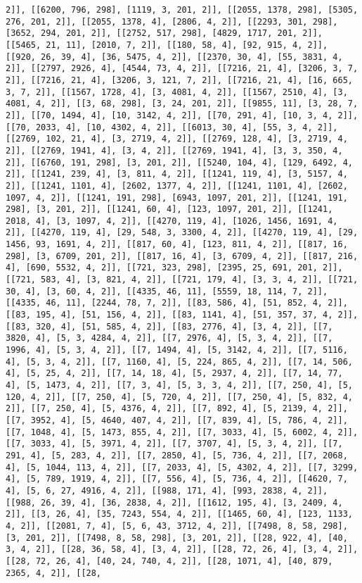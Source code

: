 \documentclass[12pt,fleqn]{article}\usepackage{../../common}
\begin{document}
\begin{verbatim}
2]], [[6200, 796, 298], [1119, 3, 201, 2]], [[2055, 1378, 298], [5305, 276, 201, 2]], [[2055, 1378, 4], [2806, 4, 2]], [[2293, 301, 298], [3652, 294, 201, 2]], [[2752, 517, 298], [4829, 1717, 201, 2]], [[5465, 21, 11], [2010, 7, 2]], [[180, 58, 4], [92, 915, 4, 2]], [[920, 26, 39, 4], [36, 5475, 4, 2]], [[2370, 30, 4], [55, 3831, 4, 2]], [[2797, 2926, 4], [4544, 73, 4, 2]], [[7216, 21, 4], [3206, 3, 7, 2]], [[7216, 21, 4], [3206, 3, 121, 7, 2]], [[7216, 21, 4], [16, 665, 3, 7, 2]], [[1567, 1728, 4], [3, 4081, 4, 2]], [[1567, 2510, 4], [3, 4081, 4, 2]], [[3, 68, 298], [3, 24, 201, 2]], [[9855, 11], [3, 28, 7, 2]], [[70, 1494, 4], [10, 3142, 4, 2]], [[70, 291, 4], [10, 3, 4, 2]], [[70, 2033, 4], [10, 4302, 4, 2]], [[6013, 30, 4], [55, 3, 4, 2]], [[2769, 102, 21, 4], [3, 2719, 4, 2]], [[2769, 128, 4], [3, 2719, 4, 2]], [[2769, 1941, 4], [3, 4, 2]], [[2769, 1941, 4], [3, 3, 350, 4, 2]], [[6760, 191, 298], [3, 201, 2]], [[5240, 104, 4], [129, 6492, 4, 2]], [[1241, 239, 4], [3, 811, 4, 2]], [[1241, 119, 4], [3, 5157, 4, 2]], [[1241, 1101, 4], [2602, 1377, 4, 2]], [[1241, 1101, 4], [2602, 1097, 4, 2]], [[1241, 191, 298], [6943, 1097, 201, 2]], [[1241, 191, 298], [3, 201, 2]], [[1241, 60, 4], [123, 1097, 201, 2]], [[1241, 2018, 4], [3, 1097, 4, 2]], [[4270, 119, 4], [1026, 1456, 1691, 4, 2]], [[4270, 119, 4], [29, 548, 3, 3300, 4, 2]], [[4270, 119, 4], [29, 1456, 93, 1691, 4, 2]], [[817, 60, 4], [123, 811, 4, 2]], [[817, 16, 298], [3, 6709, 201, 2]], [[817, 16, 4], [3, 6709, 4, 2]], [[817, 216, 4], [690, 5532, 4, 2]], [[721, 323, 298], [2395, 25, 691, 201, 2]], [[721, 583, 4], [3, 821, 4, 2]], [[721, 179, 4], [3, 3, 4, 2]], [[721, 30, 4], [3, 60, 4, 2]], [[4335, 46, 11], [5559, 18, 114, 7, 2]], [[4335, 46, 11], [2244, 78, 7, 2]], [[83, 586, 4], [51, 852, 4, 2]], [[83, 195, 4], [51, 156, 4, 2]], [[83, 1141, 4], [51, 357, 37, 4, 2]], [[83, 320, 4], [51, 585, 4, 2]], [[83, 2776, 4], [3, 4, 2]], [[7, 3820, 4], [5, 3, 4284, 4, 2]], [[7, 2976, 4], [5, 3, 4, 2]], [[7, 1996, 4], [5, 3, 4, 2]], [[7, 1494, 4], [5, 3142, 4, 2]], [[7, 5116, 4], [5, 3, 4, 2]], [[7, 1160, 4], [5, 224, 865, 4, 2]], [[7, 14, 506, 4], [5, 25, 4, 2]], [[7, 14, 18, 4], [5, 2937, 4, 2]], [[7, 14, 77, 4], [5, 1473, 4, 2]], [[7, 3, 4], [5, 3, 3, 4, 2]], [[7, 250, 4], [5, 120, 4, 2]], [[7, 250, 4], [5, 720, 4, 2]], [[7, 250, 4], [5, 832, 4, 2]], [[7, 250, 4], [5, 4376, 4, 2]], [[7, 892, 4], [5, 2139, 4, 2]], [[7, 3952, 4], [5, 4640, 407, 4, 2]], [[7, 839, 4], [5, 786, 4, 2]], [[7, 1048, 4], [5, 1473, 855, 4, 2]], [[7, 3033, 4], [5, 6002, 4, 2]], [[7, 3033, 4], [5, 3971, 4, 2]], [[7, 3707, 4], [5, 3, 4, 2]], [[7, 291, 4], [5, 283, 4, 2]], [[7, 2850, 4], [5, 736, 4, 2]], [[7, 2068, 4], [5, 1044, 113, 4, 2]], [[7, 2033, 4], [5, 4302, 4, 2]], [[7, 3299, 4], [5, 789, 1919, 4, 2]], [[7, 556, 4], [5, 736, 4, 2]], [[4620, 7, 4], [5, 6, 27, 4916, 4, 2]], [[988, 171, 4], [993, 2838, 4, 2]], [[988, 26, 39, 4], [36, 2838, 4, 2]], [[1612, 195, 4], [3, 2409, 4, 2]], [[3, 26, 4], [35, 7243, 554, 4, 2]], [[1465, 60, 4], [123, 1133, 4, 2]], [[2081, 7, 4], [5, 6, 43, 3712, 4, 2]], [[7498, 8, 58, 298], [3, 201, 2]], [[7498, 8, 58, 298], [3, 201, 2]], [[28, 922, 4], [40, 3, 4, 2]], [[28, 36, 58, 4], [3, 4, 2]], [[28, 72, 26, 4], [3, 4, 2]], [[28, 72, 26, 4], [40, 24, 740, 4, 2]], [[28, 1071, 4], [40, 879, 2365, 4, 2]], [[28, 
\end{verbatim}
\end{document}
